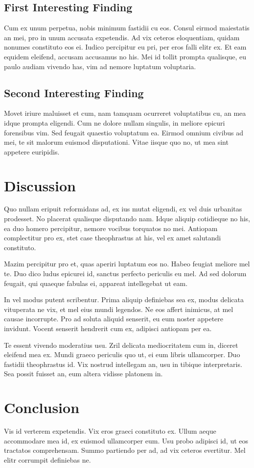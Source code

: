 \documentclass[letterpaper]{article}
\begin{document}
\subsection{First Interesting Finding}
Cum ex unum perpetua, nobis minimum fastidii cu eos. Consul eirmod maiestatis an mei, pro in unum accusata expetendis. Ad vix ceteros eloquentiam, quidam nonumes constituto eos ei. Iudico percipitur eu pri, per eros falli elitr ex. Et eam equidem eleifend, accusam accusamus no his. Mei id tollit prompta qualisque, eu paulo audiam vivendo has, vim ad nemore luptatum voluptaria.

\subsection{Second Interesting Finding}
Movet iriure maluisset et cum, nam tamquam ocurreret voluptatibus cu, an mea idque prompta eligendi. Cum ne dolore nullam singulis, in meliore epicuri forensibus vim. Sed feugait quaestio voluptatum ea. Eirmod omnium civibus ad mei, te sit malorum euismod disputationi. Vitae iisque quo no, ut mea sint appetere euripidis.

\section{Discussion}
Quo nullam eripuit reformidans ad, ex ius mutat eligendi, ex vel duis urbanitas prodesset. No placerat qualisque disputando nam. Idque aliquip cotidieque no his, ea duo homero percipitur, nemore vocibus torquatos no mei. Antiopam complectitur pro ex, stet case theophrastus at his, vel ex amet salutandi constituto.

Mazim percipitur pro et, quas aperiri luptatum eos no. Habeo feugiat meliore mel te. Duo dico ludus epicurei id, sanctus perfecto periculis eu mel. Ad sed dolorum feugait, qui quaeque fabulas ei, appareat intellegebat ut eam.

In vel modus putent scribentur. Prima aliquip definiebas sea ex, modus delicata vituperata ne vix, et mel eius mundi legendos. Ne eos affert inimicus, at mel causae incorrupte. Pro ad soluta aliquid senserit, eu eum noster appetere invidunt. Vocent senserit hendrerit cum ex, adipisci antiopam per ea.

Te essent vivendo moderatius usu. Zril delicata mediocritatem cum in, diceret eleifend mea ex. Mundi graeco periculis quo ut, ei eum libris ullamcorper. Duo fastidii theophrastus id. Vix nostrud intellegam an, usu in tibique interpretaris. Sea possit fuisset an, eum altera vidisse platonem in.

\section{Conclusion}
Vis id verterem expetendis. Vix eros graeci constituto ex. Ullum aeque accommodare mea id, ex euismod ullamcorper eum. Usu probo adipisci id, ut eos tractatos comprehensam. Summo partiendo per ad, ad vix ceteros evertitur. Mel elitr corrumpit definiebas ne.

%
%

\printbibliography
\end{document}
